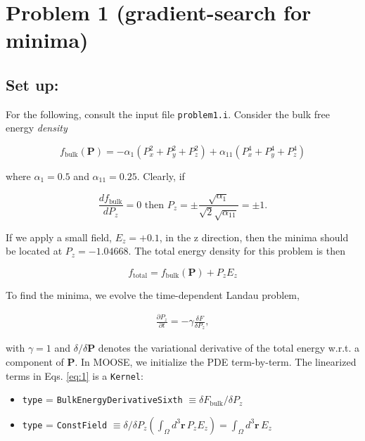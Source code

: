 \documentclass[paper=a4, fontsize=14pt]{scrartcl} %
\numberwithin{equation}{section} %
\numberwithin{figure}{section} %
\numberwithin{table}{section} %
\begin{document}
\newpage

\vspace*{-65pt}

\section*{Problem 1 (gradient-search for minima)}

\vspace*{-10pt}

\subsection*{Set up:}

For the following, consult the input file \texttt{problem1.i}. Consider the bulk free energy \emph{density}

$$f_\mathrm{bulk}(\textbf{P}) = - \alpha_1 \left(P_x^2 + P_y^2 + P_z^2 \right) + \alpha_{11} \left(P_x^4 + P_y^4 + P_z^4 \right) $$

where $\alpha_1 = 0.5$ and $\alpha_{11} = 0.25$. Clearly, if 

$$\frac{d f_\mathrm{bulk} }{d P_z} = 0 \,\, \mathrm{then} \,\, P_z = \pm \frac{\sqrt{\alpha_1}}{\sqrt{2} \sqrt{\alpha_{11}}} = \pm 1.$$ 

If we apply a small field, $E_z = + 0.1$,  in the z direction, then the minima should be located at $P_z =  -1.04668$. The total energy density for this problem is then

$$f_\mathrm{total} = f_\mathrm{bulk}(\textbf{P} ) + P_z E_z$$

To find the minima, we evolve the time-dependent Landau problem,

\begin{align}\tag{1}\label{eq:1}
\frac{\partial P_z}{\partial t} = - \gamma \frac{\delta F}{\delta P_z},
\end{align}

with $\gamma = 1$ and $\delta/\delta \textbf{P}$ denotes the variational derivative of the total energy w.r.t. a component of $\textbf{P}$.  In \textsc{MOOSE}, we initialize the PDE term-by-term. The linearized terms in Eqs. \ref{eq:1} is a \texttt{Kernel}:

\begin{itemize}
\item \texttt{type} = \texttt{BulkEnergyDerivativeSixth} $\equiv \delta F_\mathrm{bulk} /\delta P_z$
\item \texttt{type} = \texttt{ConstField} $\equiv \delta / \delta P_z \left(\int_\Omega d^3 \textbf{r}\, P_z E_z \right) = \int_\Omega  d^3 \textbf{r} \,E_z$
\end{itemize}
\end{document}
